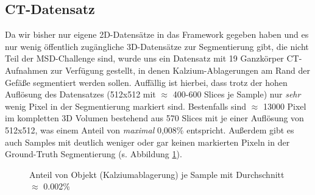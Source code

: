 \subsection{CT-Datensatz}
Da wir bisher nur eigene 2D-Datensätze in das Framework gegeben haben und es nur wenig öffentlich zugängliche 3D-Datensätze zur Segmentierung gibt, die nicht Teil der MSD-Challenge \cite{msdChallenge} sind, wurde uns ein Datensatz mit 19 Ganzkörper CT-Aufnahmen zur Verfügung gestellt, in denen Kalzium-Ablagerungen am Rand der Gefäße segmentiert werden sollen.
Auffällig ist hierbei, dass trotz der hohen Auflösung des Datensatzes (512x512 mit $\approx$ 400-600 Slices je Sample) nur \textit{sehr} wenig Pixel in der Segmentierung markiert sind. Bestenfalls sind $\approx$ 13000 Pixel im kompletten 3D Volumen bestehend aus 570 Slices mit je einer Auflösung von 512x512, was einem Anteil von \textit{maximal} 0,008\% entspricht. Außerdem gibt es auch Samples mit deutlich weniger oder gar keinen markierten Pixeln in der Ground-Truth Segmentierung (s. Abbildung \ref{pic:Haeuf_109}).

\begin{figure}[H]


\caption{Anteil von Objekt (Kalziumablagerung) je Sample mit Durchschnitt $\approx$ 0.002\%}
\label{pic:Haeuf_109}
\end{figure}



